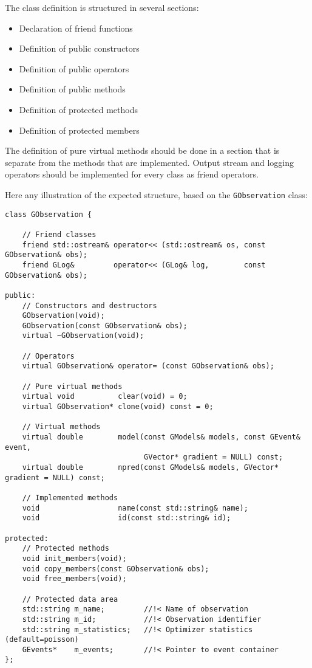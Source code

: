 \documentclass{article}[12pt,a4]
\begin{document}
The class definition is structured in several sections:
\begin{itemize}
\item Declaration of friend functions
\item Definition of public constructors
\item Definition of public operators
\item Definition of public methods
\item Definition of protected methods
\item Definition of protected members
\end{itemize}
The definition of pure virtual methods should be done in a section that is separate from the
methods that are implemented.
Output stream and logging operators should be implemented for every class as friend
operators.

Here any illustration of the expected structure, based on the {\tt GObservation} class:
\begin{verbatim}
class GObservation {

    // Friend classes
    friend std::ostream& operator<< (std::ostream& os, const GObservation& obs);
    friend GLog&         operator<< (GLog& log,        const GObservation& obs);

public:
    // Constructors and destructors
    GObservation(void);
    GObservation(const GObservation& obs);
    virtual ~GObservation(void);

    // Operators
    virtual GObservation& operator= (const GObservation& obs);

    // Pure virtual methods
    virtual void          clear(void) = 0;
    virtual GObservation* clone(void) const = 0;

    // Virtual methods
    virtual double        model(const GModels& models, const GEvent& event,
                                GVector* gradient = NULL) const;
    virtual double        npred(const GModels& models, GVector* gradient = NULL) const;

    // Implemented methods
    void                  name(const std::string& name);
    void                  id(const std::string& id);

protected:
    // Protected methods
    void init_members(void);
    void copy_members(const GObservation& obs);
    void free_members(void);

    // Protected data area
    std::string m_name;         //!< Name of observation
    std::string m_id;           //!< Observation identifier
    std::string m_statistics;   //!< Optimizer statistics (default=poisson)
    GEvents*    m_events;       //!< Pointer to event container
};
\end{verbatim}
\end{document}
